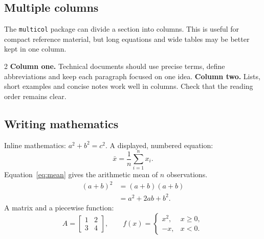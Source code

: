 \subsection{Multiple columns}
The \texttt{multicol} package can divide a section into columns. This is useful for compact reference material, but long equations and wide tables may be better kept in one column.
\begin{multicols}{2}
\textbf{Column one.} Technical documents should use precise terms, define abbreviations and keep each paragraph focused on one idea.
\columnbreak
\textbf{Column two.} Lists, short examples and concise notes work well in columns. Check that the reading order remains clear.
\end{multicols}
\subsection{Writing mathematics}
Inline mathematics: $a^2+b^2=c^2$. A displayed, numbered equation:
\begin{equation}\label{eq:mean}\bar{x}=\frac{1}{n}\sum_{i=1}^{n}x_i.\end{equation}
Equation~\ref{eq:mean} gives the arithmetic mean of $n$ observations.
\begin{align}(a+b)^2&=(a+b)(a+b)\\&=a^2+2ab+b^2.\end{align}
A matrix and a piecewise function:
\[
A=\begin{bmatrix}1&2\\3&4\end{bmatrix},\qquad
f(x)=\begin{cases}x^2,&x\geq0,\\-x,&x<0.\end{cases}
\]
